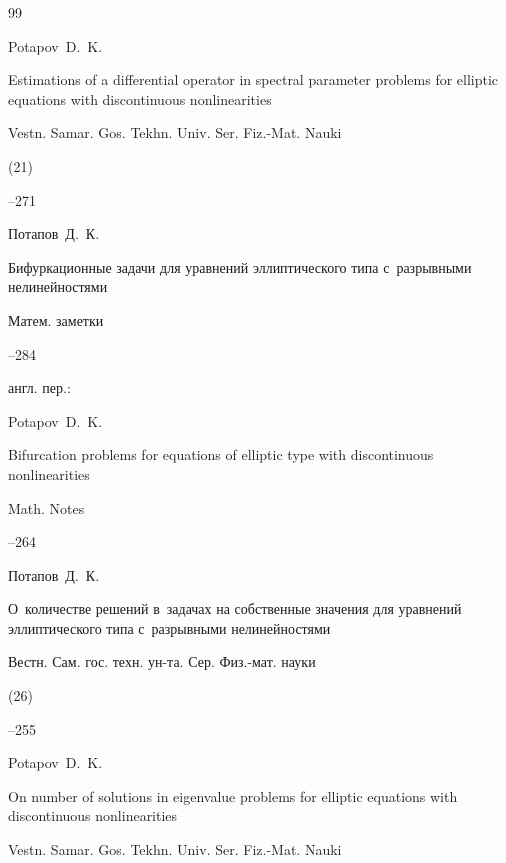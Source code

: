 \begin{thebibliography}{99}
\misctransl

\by Potapov~D.~K.

\paper Estimations of a differential operator in spectral  parameter problems for elliptic equations with discontinuous nonlinearities

\jour  Vestn. Samar. Gos. Tekhn. Univ. Ser. Fiz.-Mat. Nauki


(21)

--271




\by Потапов~Д.~К.

\paper Бифуркационные задачи для уравнений эллиптического типа с~разрывными нелинейностями

\jour Матем. заметки




--284

\transl англ. пер.:~

\by Potapov~D.~K.

\paper Bifurcation problems for equations of elliptic type with discontinuous nonlinearities

\jour Math. Notes




--264






\by Потапов~Д.~К.

\paper О~количестве решений в~задачах на собственные значения  для уравнений эллиптического типа с~разрывными нелинейностями

\jour Вестн. Сам. гос. техн. ун-та. Сер. Физ.-мат. науки


(26)

--255

\misctransl

\by Potapov~D.~K.

\paper On number of solutions in eigenvalue problems for  elliptic equations with discontinuous nonlinearities

\jour Vestn. Samar.  Gos. Tekhn. Univ. Ser. Fiz.-Mat. Nauki


\end{thebibliography}
